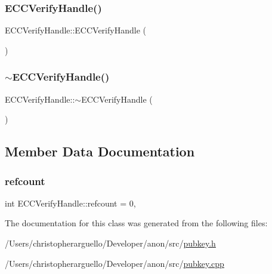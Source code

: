 \subsubsection{\texorpdfstring{E\+C\+C\+Verify\+Handle()}{ECCVerifyHandle()}}
{\footnotesize\ttfamily E\+C\+C\+Verify\+Handle\+::\+E\+C\+C\+Verify\+Handle (\begin{DoxyParamCaption}{ }\end{DoxyParamCaption})}

\mbox{\label{class_e_c_c_verify_handle_a17dea6c87a0f825f0f24a06a20e2baf9}} 
\subsubsection{\texorpdfstring{$\sim$\+E\+C\+C\+Verify\+Handle()}{~ECCVerifyHandle()}}
{\footnotesize\ttfamily E\+C\+C\+Verify\+Handle\+::$\sim$\+E\+C\+C\+Verify\+Handle (\begin{DoxyParamCaption}{ }\end{DoxyParamCaption})}



\subsection{Member Data Documentation}
\mbox{\label{class_e_c_c_verify_handle_a5dcdd8e40cc4aed9ed7c67e4f400e51d}} 
\subsubsection{\texorpdfstring{refcount}{refcount}}
{\footnotesize\ttfamily int E\+C\+C\+Verify\+Handle\+::refcount = 0\hspace{0.3cm}{\ttfamily [static]}, {\ttfamily [private]}}



The documentation for this class was generated from the following files\+:\begin{DoxyCompactItemize}
\item 
/\+Users/christopherarguello/\+Developer/anon/src/\mbox{\hyperlink{pubkey_8h}{pubkey.\+h}}\item 
/\+Users/christopherarguello/\+Developer/anon/src/\mbox{\hyperlink{pubkey_8cpp}{pubkey.\+cpp}}\end{DoxyCompactItemize}
